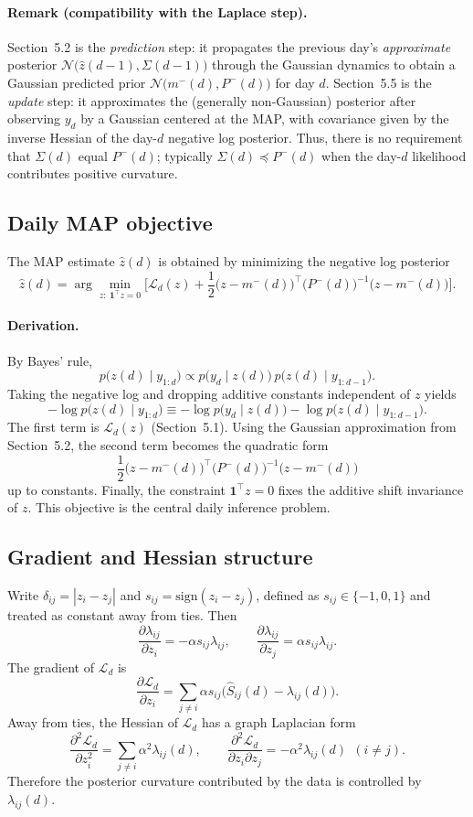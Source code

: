 \documentclass[11pt]{article}
\begin{document}
\paragraph{Remark (compatibility with the Laplace step).}
Section~5.2 is the \emph{prediction} step: it propagates the previous day's \emph{approximate} posterior
$\mathcal N\!\big(\widehat z(d-1),\Sigma(d-1)\big)$ through the Gaussian dynamics to obtain a Gaussian predicted prior
$\mathcal N\!\big(m^-(d),P^-(d)\big)$ for day $d$.
Section~5.5 is the \emph{update} step: it approximates the (generally non-Gaussian) posterior after observing $y_d$
by a Gaussian centered at the MAP, with covariance given by the inverse Hessian of the day-$d$ negative log posterior.
Thus, there is no requirement that $\Sigma(d)$ equal $P^-(d)$; typically $\Sigma(d)\preceq P^-(d)$ when the day-$d$
likelihood contributes positive curvature.

\subsection{Daily MAP objective}
The MAP estimate $\widehat z(d)$ is obtained by minimizing the negative log posterior
\[
\widehat z(d)
=
\arg\min_{z:\ \mathbf{1}^\top z=0}
\Big[
\mathcal L_d(z)
+\frac12\big(z-m^-(d)\big)^\top \big(P^-(d)\big)^{-1}\big(z-m^-(d)\big)
\Big].
\]
\paragraph{Derivation.}
By Bayes' rule,
\[
p\big(z(d)\mid y_{1:d}\big)\propto p\big(y_d\mid z(d)\big)\,p\big(z(d)\mid y_{1:d-1}\big).
\]
Taking the negative log and dropping additive constants independent of $z$ yields
\[
-\log p\big(z(d)\mid y_{1:d}\big)
\equiv
-\log p\big(y_d\mid z(d)\big)-\log p\big(z(d)\mid y_{1:d-1}\big).
\]
The first term is $\mathcal L_d(z)$ (Section~5.1).
Using the Gaussian approximation from Section~5.2, the second term becomes the quadratic form
\[
\frac12\big(z-m^-(d)\big)^\top\big(P^-(d)\big)^{-1}\big(z-m^-(d)\big)
\]
up to constants.
Finally, the constraint $\mathbf{1}^\top z=0$ fixes the additive shift invariance of $z$.
This objective is the central daily inference problem.

\subsection{Gradient and Hessian structure}
Write $\delta_{ij}=|z_i-z_j|$ and $s_{ij}=\mathrm{sign}(z_i-z_j)$, defined as $s_{ij}\in\{-1,0,1\}$ and treated as constant away from ties.
Then
\[
\frac{\partial \lambda_{ij}}{\partial z_i} = -\alpha s_{ij}\lambda_{ij},
\qquad
\frac{\partial \lambda_{ij}}{\partial z_j} = \alpha s_{ij}\lambda_{ij}.
\]
The gradient of $\mathcal L_d$ is
\[
\frac{\partial \mathcal L_d}{\partial z_i}
=
\sum_{j\ne i}\alpha s_{ij}\big(\widehat S_{ij}(d)-\lambda_{ij}(d)\big).
\]
Away from ties, the Hessian of $\mathcal L_d$ has a graph Laplacian form
\[
\frac{\partial^2 \mathcal L_d}{\partial z_i^2}
=
\sum_{j\ne i}\alpha^2 \lambda_{ij}(d),
\qquad
\frac{\partial^2 \mathcal L_d}{\partial z_i\partial z_j}
=
-\alpha^2 \lambda_{ij}(d)\ \ (i\ne j).
\]
Therefore the posterior curvature contributed by the data is controlled by $\lambda_{ij}(d)$.
\end{document}

